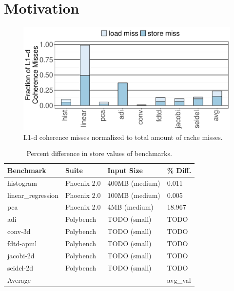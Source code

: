 \section{Motivation}


\begin{figure}[t]
	\centerline{\includegraphics[scale=0.4]{graphs/coherence_misses_L1.pdf}}
	\caption{L1-d coherence misses normalized to total amount of cache misses.}
\label{fig:coherence_misses}
\end{figure}

\begin{table}[t]
\caption{Percent difference in store values of benchmarks.}
\begin{tabular}{|llll|}
\hline
\textbf{Benchmark} & \textbf{Suite} & \textbf{Input Size} & \textbf{\% Diff.	}\\ \hline

histogram & Phoenix 2.0 & 400MB (medium) & 0.011 \\

linear\_regression & Phoenix 2.0 & 100MB (medium) & 0.005 \\

pca & Phoenix 2.0 & 4MB (medium) & 18.967 \\

adi & Polybench &  TODO (small) & TODO \\

conv-3d & Polybench & TODO (small) & TODO\\

fdtd-apml & Polybench & TODO (small) &  TODO\\

jacobi-2d & Polybench & TODO (small) & TODO\\

seidel-2d & Polybench & TODO (small) & TODO\\ \hline

Average &  &          & avg\_val\\ \hline
\end{tabular}
\label{tab:benchmarks}
\end{table}

